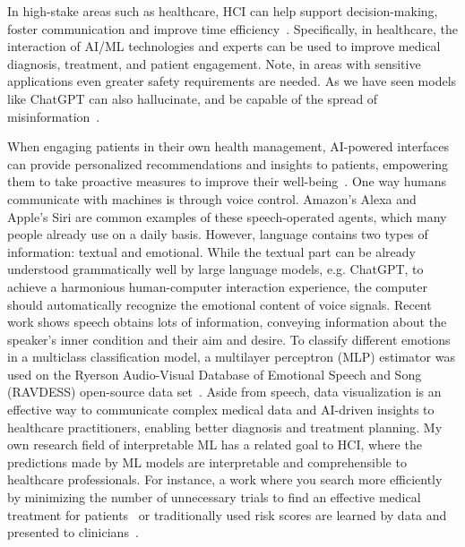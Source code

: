 \documentclass[11pt,runningheads]{article}
\begin{document}
In high-stake areas such as healthcare, HCI can help support decision-making, foster communication and improve time efficiency~\cite{sainfort2009human}. Specifically, in healthcare, the interaction of AI/ML technologies and experts can be used to improve medical diagnosis, treatment, and patient engagement. Note, in areas with sensitive applications even greater safety requirements are needed. As we have seen models like ChatGPT can also hallucinate, and be capable of the spread of misinformation~\cite{alkaissi2023artificial}.

When engaging patients in their own health management, AI-powered interfaces can provide personalized recommendations and insights to patients, empowering them to take proactive measures to improve their well-being~\cite{sainfort2009human}. One way humans communicate with machines is through voice control. Amazon's Alexa and Apple's Siri are common examples of these speech-operated agents, which many people already use on a daily basis. 
However, language contains two types of information: textual and emotional.
While the textual part can be already understood grammatically well by large language models, e.g. ChatGPT, to achieve a harmonious human-computer interaction experience, the computer should automatically recognize the emotional content of voice signals. Recent work shows speech obtains lots of information, conveying information about the speaker’s inner condition and their aim and desire.  To classify different emotions in a multiclass classification model, a multilayer perceptron (MLP) estimator was used on the Ryerson Audio-Visual Database of Emotional Speech and Song (RAVDESS) open-source data set~\cite{alnuaim2022human}.
Aside from speech, data visualization is an effective way to communicate complex medical data and AI-driven insights to healthcare practitioners, enabling better diagnosis and treatment planning. My own research field of interpretable ML has a related goal to HCI, where the predictions made by ML models are interpretable and comprehensible to healthcare professionals. For instance, a work where you search more efficiently by minimizing the number of unnecessary trials to find an effective medical treatment for patients~\cite{haakansson2020learning} or traditionally used risk scores are learned by data and presented to clinicians~\cite{ustun2019learning}. 
\end{document}
